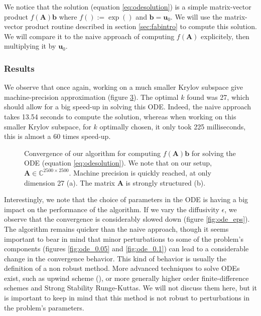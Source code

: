 \documentclass[11pt]{article}
\numberwithin{equation}{section}
\begin{document}
We notice that the solution (equation \ref{eq:odesolution}) is a simple matrix-vector product $f(\mathbf{A})\mathbf{b}$ where $f() := \exp()$ and $\mathbf{b} = \mathbf{u}_0$. We will use the matrix-vector product routine described in section \ref{sec:fabintro} to compute this solution. We will compare it to the naive approach of computing $f(\mathbf{A})$ explicitely, then multiplying it by $\mathbf{u}_0$.
\subsubsection{Results}

We observe that once again, working on a much smaller Krylov subspace give machine-precision approximation (figure \ref{fig:ode_comp}). The optimal $k$ found was 27, which should allow for a big speed-up in solving this ODE. Indeed, the naive approach takes 13.54 seconds to compute the solution, whereas when working on this smaller Krylov subspace, for $k$ optimally chosen, it only took 225 milliseconds, this is almost a 60 times speed-up.

\begin{figure}
    \begin{subfigure}[b]{.45\linewidth}
        
        \caption{}
        \label{fig:ode_conv}
    \end{subfigure}\hspace{.05\linewidth}
    \begin{subfigure}[b]{.45\linewidth}
        
        \caption{}
        \label{fig:ose_sparse}
    \end{subfigure}
    \caption{Convergence of our algorithm for computing $f(\mathbf{A})\mathbf{b}$ for solving the ODE (equation \ref{eq:odesolution}). We note that on our setup, $\mathbf{A}\in\mathbb{C}^{2500\times 2500}$. Machine precision is quickly reached, at only dimension 27 (a). The matrix $\mathbf{A}$ is strongly structured (b).}
    \label{fig:ode_comp}
\end{figure}

Interestingly, we note that the choice of parameters in the ODE is having a big impact on the performance of the algorithm. If we vary the diffusivity $\epsilon$, we observe that the convergence is considerably slowed down (figure \ref{fig:ode_eps}). The algorithm remains quicker than the naive approach, though it seems important to bear in mind that minor perturbations to some of the problem's components (figures \ref{fig:ode_0.05} and \ref{fig:ode_0.1}) can lead to a considerable change in the convergence behavior. This kind of behavior is usually the definition of a non robust method. More advanced techniques to solve ODEs exist, such as upwind scheme (\cite{lewis2004fundamentals}), or more generally higher order finite-difference schemes and Strong Stability Runge-Kuttas. We will not discuss them here, but it is important to keep in mind that this method is not robust to perturbations in the problem's parameters.
\end{document}
